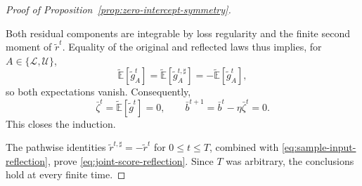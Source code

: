 \begin{proof}[Proof of Proposition~\ref{prop:zero-intercept-symmetry}]
\begin{enumerate}[wide]
    Both residual components are integrable by loss
    regularity and the finite second moment of $\tilde r^t$.
    Equality of the original and reflected laws thus implies,
    for $A\in\{\mathcal L,\mathcal U\}$,
    \[
        \tilde{\mathbb E}[\tilde g_A^t]
        =
        \tilde{\mathbb E}[\tilde g_A^{t,\sharp}]
        =
        -\tilde{\mathbb E}[\tilde g_A^t],
    \]
    so both expectations vanish.
    Consequently,
    \[
        \bar\zeta^t
        =
        \tilde{\mathbb E}[\tilde g^t]
        =0,
        \qquad
        \bar b^{t+1}
        =
        \bar b^t-\eta\bar\zeta^t
        =0.
    \]
    This closes the induction.
\end{enumerate}
The pathwise identities
$\tilde r^{t,\sharp}=-\tilde r^t$ for $0\leq t\leq T$,
combined with \eqref{eq:sample-input-reflection}, prove
\eqref{eq:joint-score-reflection}.
Since $T$ was arbitrary, the conclusions hold at every
finite time.
\end{proof}

